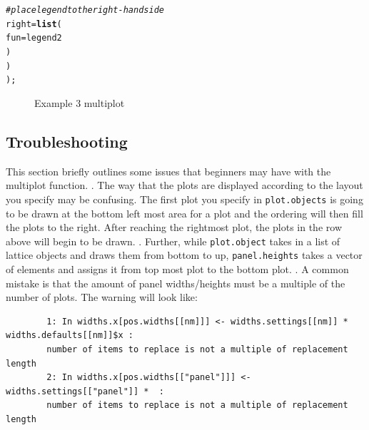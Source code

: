 \documentclass[letterpaper]{report}\usepackage[]{graphicx}\usepackage[]{color}
\makeatletter
\newcommand{\hlcom}[1]{\textcolor[rgb]{0.678,0.584,0.686}{\textit{#1}}}%
\newcommand{\hlstd}[1]{\textcolor[rgb]{0.345,0.345,0.345}{#1}}%
\newcommand{\hlkwc}[1]{\textcolor[rgb]{0.333,0.667,0.333}{#1}}%
\newcommand{\hlkwd}[1]{\textcolor[rgb]{0.737,0.353,0.396}{\textbf{#1}}}%
\newenvironment{kframe}{%
 \def\at@end@of@kframe{}%
 \ifinner\ifhmode%
  \def\at@end@of@kframe{\end{minipage}}%
  \begin{minipage}{\columnwidth}%
 \fi\fi%
 \def\FrameCommand##1{\hskip\@totalleftmargin \hskip-\fboxsep
 \colorbox{shadecolor}{##1}\hskip-\fboxsep
     \hskip-\linewidth \hskip-\@totalleftmargin \hskip\columnwidth}%
 \MakeFramed {\advance\hsize-\width
   \@totalleftmargin\z@ \linewidth\hsize
   \@setminipage}}%
 {\par\unskip\endMakeFramed%
 \at@end@of@kframe}
\newenvironment{knitrout}{}{} %
\makeatother
\begin{document}
\begin{knitrout}
\begin{kframe}
\begin{alltt}
        \hlcom{# place legend to the right-hand side}
        \hlkwc{right} \hlstd{=} \hlkwd{list}\hlstd{(}
                \hlkwc{fun} \hlstd{= legend2}
                \hlstd{)}
        \hlstd{)}
    \hlstd{);}
\end{alltt}
\end{kframe}\begin{figure}

{\centering {} 

}

\caption[Example 3 multiplot]{Example 3 multiplot}\label{fig:multiplotex3_final}
\end{figure}


\end{knitrout}

\subsection{Troubleshooting}
This section briefly outlines some issues that beginners may have with the multiplot function. 
\newline
{}. The way that the plots are displayed according to the layout you specify may be confusing. The first plot you specify in \texttt{plot.objects} is going to be drawn at the bottom left most area for a plot and the ordering will then fill the plots to the right. After reaching the rightmost plot, the plots in the row above will begin to be drawn. 
\newline
{}. Further, while \texttt{plot.object} takes in a list of lattice objects and draws them from bottom to up, \texttt{panel.heights} takes a vector of elements and assigns it from top most plot to the bottom plot.
\newline
{}. A common mistake is that the amount of panel widths/heights must be a multiple of the number of plots. The warning will look like:

\begin{verbatim}
        1: In widths.x[pos.widths[[nm]]] <- widths.settings[[nm]] * widths.defaults[[nm]]$x : 
        number of items to replace is not a multiple of replacement length
        2: In widths.x[pos.widths[["panel"]]] <- widths.settings[["panel"]] *  :
        number of items to replace is not a multiple of replacement length
\end{verbatim}
\end{document}
